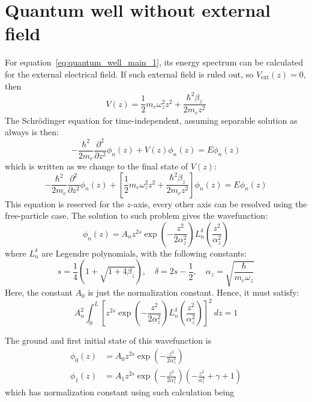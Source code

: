 \documentclass{article}
\begin{document}
\section{Quantum well without external field}
For equation~\ref{eq:quantum_well_main_1}, its energy spectrum can be calculated for the external electrical field. If such external field is ruled out, so $V_{\mathrm{ext}}(z)=0$, then 
\begin{equation}\label{eq:quantum_well_main_2}
    V(z)=\frac{1}{2}m_{{e}}\omega_{z}^{2}z^{2}+ \frac{\hbar^{2}\beta_{z}}{2m_{e}z^{2}} 
\end{equation}
The Schrödinger equation for time-independent, assuming separable solution as always is then:
\begin{equation}
    -\frac{\hbar^{2}}{2m_{e}} \frac{\partial^{2}}{\partial z^{2}} \phi_{n}(z) + V(z)\phi_{n}(z) = E\phi_{n}(z)
\end{equation}
which is written as we change to the final state of $V(z)$:
\begin{equation}
    -\frac{\hbar^{2}}{2m_{e}} \frac{\partial^{2}}{\partial z^{2}} \phi_{n}(z) + \left[\frac{1}{2}m_{{e}}\omega_{z}^{2}z^{2}+ \frac{\hbar^{2}\beta_{z}}{2m_{e}z^{2}}\right]\phi_{n}(z) = E\phi_{n}(z)
\end{equation}
This equation is reserved for the $z$-axis, every other axis can be resolved using the free-particle case. The solution to such problem gives the wavefunction: 
\begin{equation}
    \phi_{n}(z) = A_{n}z^{2s}\exp{\left(-\frac{z^{2}}{2\alpha_{z}^{2}}\right)}L^{\delta}_{n}\left(\frac{z^{2}}{\alpha_{z}^{2}}\right)
\end{equation}
where $L^{\delta}_{n}$ are Legendre polynomials, with the following constants: 
\begin{equation}
    s=\frac{1}{4}\left(1+\sqrt{1+4\beta_{z}}\right), \quad \delta = 2s - \frac{1}{2}, \quad \alpha_{z} = \sqrt{\frac{\hbar}{m_{e}\omega_{z}}}
\end{equation}
Here, the constant $A_{0}$ is just the normalization constant. Hence, it must satisfy: 
\begin{equation}
    A_{n}^{2} \int_{0}^{L} \left[z^{2s}\exp{\left(-\frac{z^{2}}{2\alpha_{z}^{2}}\right)}L^{\delta}_{n}\left(\frac{z^{2}}{\alpha_{z}^{2}}\right)\right]^{2} \: dz = 1
\end{equation}

The ground and first initial state of this wavefunction is 
\begin{align}
    \phi_{0}(z) & = A_{0}z^{2s}\exp{\left(-\frac{z^{2}}{2\alpha^{2}_{z}}\right)} \\
    \phi_{1}(z) & = A_{1} z^{2s}\exp{\left( -\frac{z^{2}}{2\alpha^{2}_{z}} \right)} \left(-\frac{z^{2}}{\alpha_{z}^{2}}+\gamma + 1\right)
\end{align}
which has normalization constant using such calculation being 
\end{document}
